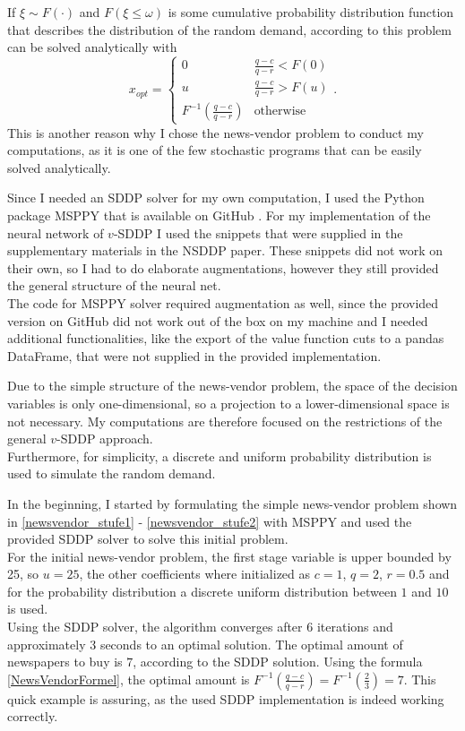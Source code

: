 If $\xi \sim F(\cdot)$ and $F(\xi \leq \omega)$ is some cumulative probability distribution function that describes the distribution of the random demand, according to \cite{BirgeLouveaux} this problem can be solved analytically  with
\begin{equation*}\label{NewsVendorFormel}
    x_{opt} = \begin{cases}
    0 & \frac{q - c}{q - r} < F(0)\\
    u & \frac{q - c}{q - r} > F(u)\\
    F^{-1}(\frac{q - c}{q - r}) & \text{otherwise}
    \end{cases}.
\end{equation*}
This is another reason why I chose the news-vendor problem to conduct my computations, as it is one of the few stochastic programs that can be easily solved analytically.

Since I needed an SDDP solver for my own computation, I used the Python package MSPPY that is available on GitHub \cite{SDDP_Solver_Paper}.
For my implementation of the neural network of $v$-SDDP I used the snippets that were supplied in the supplementary materials in the NSDDP paper.
These snippets did not work on their own, so I had to do elaborate augmentations, however they still provided the general structure of the neural net. \\
The code for MSPPY solver required augmentation as well, since the provided version on GitHub did not work out of the box on my machine and I needed additional functionalities, like the export of the value function cuts to a pandas DataFrame, that were not supplied in the provided implementation.

Due to the simple structure of the news-vendor problem, the space of the decision variables is only one-dimensional, so a projection to a lower-dimensional space is not necessary.
My computations are therefore focused on the restrictions of the general $v$-SDDP approach. \\
Furthermore, for simplicity, a discrete and uniform probability distribution is used to simulate the random demand.

In the beginning, I started by formulating the simple news-vendor problem shown in \ref{newsvendor_stufe1} - \ref{newsvendor_stufe2} with MSPPY and used the provided SDDP solver to solve this initial problem. \\
For the initial news-vendor problem, the first stage variable is upper bounded by 25, so $u=25$, the other coefficients where initialized as $c=1$, $q=2$, $r=0.5$ and for the probability distribution a discrete uniform distribution between $1$ and $10$ is used. \\
Using the SDDP solver, the algorithm converges after 6 iterations and approximately 3 seconds to an optimal solution.
The optimal amount of newspapers to buy is $7$, according to the SDDP solution.
Using the formula \ref{NewsVendorFormel}, the optimal amount is $F^{-1}(\frac{q-c}{q-r}) = F^{-1}(\frac{2}{3})=7$.
This quick example is assuring, as the used SDDP implementation is indeed working correctly.

